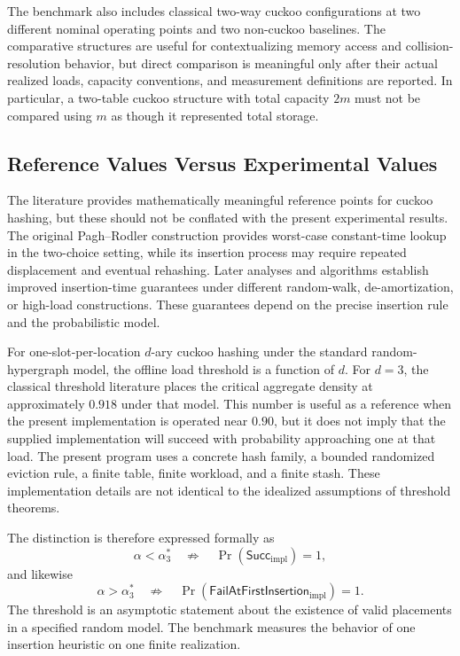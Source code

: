 \documentclass[conference]{IEEEtran}
\begin{document}
The benchmark also includes classical two-way cuckoo configurations at two different nominal operating points and two non-cuckoo baselines. The comparative structures are useful for contextualizing memory access and collision-resolution behavior, but direct comparison is meaningful only after their actual realized loads, capacity conventions, and measurement definitions are reported. In particular, a two-table cuckoo structure with total capacity $2m$ must not be compared using $m$ as though it represented total storage.

\subsection{Reference Values Versus Experimental Values}
\label{subsec:reference_vs_observed}

The literature provides mathematically meaningful reference points for cuckoo hashing, but these should not be conflated with the present experimental results. The original Pagh--Rodler construction provides worst-case constant-time lookup in the two-choice setting, while its insertion process may require repeated displacement and eventual rehashing. Later analyses and algorithms establish improved insertion-time guarantees under different random-walk, de-amortization, or high-load constructions. These guarantees depend on the precise insertion rule and the probabilistic model.

For one-slot-per-location $d$-ary cuckoo hashing under the standard random-hypergraph model, the offline load threshold is a function of $d$. For $d=3$, the classical threshold literature places the critical aggregate density at approximately $0.918$ under that model. This number is useful as a reference when the present implementation is operated near $0.90$, but it does not imply that the supplied implementation will succeed with probability approaching one at that load. The present program uses a concrete hash family, a bounded randomized eviction rule, a finite table, finite workload, and a finite stash. These implementation details are not identical to the idealized assumptions of threshold theorems.

The distinction is therefore expressed formally as
\begin{equation}
    \alpha < \alpha_3^{*}
    \quad \not\Rightarrow \quad
    \Pr\!\left(\mathsf{Succ}_{\mathrm{impl}}\right)=1,
\end{equation}
and likewise
\begin{equation}
    \alpha > \alpha_3^{*}
    \quad \not\Rightarrow \quad
    \Pr\!\left(\mathsf{FailAtFirstInsertion}_{\mathrm{impl}}\right)=1.
\end{equation}
The threshold is an asymptotic statement about the existence of valid placements in a specified random model. The benchmark measures the behavior of one insertion heuristic on one finite realization.
\end{document}
